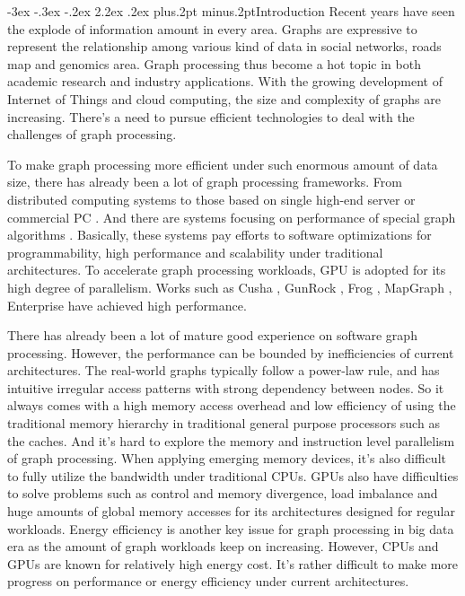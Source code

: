 \documentclass[twoside]{article}
\makeatletter
\def\section{\@startsection{section}{1}{\z@}%
 {-3ex \@plus -.3ex \@minus -.2ex}%
 {2.2ex \@plus.2ex}%
{\normalfont\normalsize\protect\baselineskip=14.5pt plus.2pt minus.2pt\bfseries}}
\makeatother
\begin{document}
\begin{multicols}{2}

\section{Introduction}
Recent years have seen the explode of information amount in every area. Graphs are expressive to represent the relationship among various kind of data in social networks, roads map and genomics area. Graph processing thus become a hot topic in both academic research and industry applications. With the growing development of Internet of Things and cloud computing, the size and complexity of graphs are increasing. There's a need to pursue efficient technologies to deal with the challenges of graph processing.

To make graph processing more efficient under such enormous amount of data size, there has already been a lot of graph processing frameworks. From distributed computing systems \cite{Malewicz2010pregel, low2012graphlab} to those based on single high-end server \cite{Shun2013ligra} or commercial PC \cite{Kyrola2012graphchi, Roy2013x-stream}. And there are systems focusing on performance of special graph algorithms \cite{liu2015enterprise}. Basically, these systems pay efforts to software optimizations for programmability, high performance and scalability under traditional architectures. To accelerate graph processing workloads, GPU is adopted for its high degree of parallelism. Works such as Cusha \cite{khorasani2014cusha}, GunRock \cite{Wang2016gunrock}, Frog \cite{shi2018frog}, MapGraph \cite{Fu2014mapgraph}, Enterprise \cite{liu2015enterprise} have achieved high performance. 

There has already been a lot of mature good experience on software graph processing. However, the performance can be bounded by inefficiencies of current architectures. The real-world graphs typically follow a power-law rule, and has intuitive irregular access patterns with strong dependency between nodes. So it always comes with a high memory access overhead and low efficiency of using the traditional memory hierarchy in traditional general purpose processors such as the caches. And it's hard to explore the memory and instruction level parallelism of graph processing. When applying emerging memory devices, it's also difficult to fully utilize the bandwidth under traditional CPUs. GPUs also have difficulties to solve problems such as control and memory divergence, load imbalance and huge amounts of global memory accesses for its architectures designed for regular workloads. Energy efficiency is another key issue for graph processing in big data era as the amount of graph workloads keep on increasing. However, CPUs and GPUs are known for relatively high energy cost. It's rather difficult to make more progress on performance or energy efficiency under current architectures.


\end{multicols}
\end{document}
